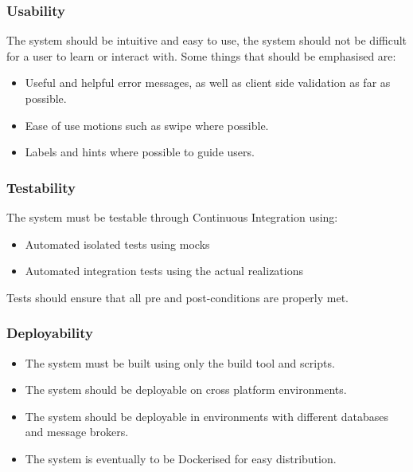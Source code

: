 \documentclass[11pt,a4paper]{article}
\begin{document}
\subsubsection{Usability}
The system should be intuitive and easy to use, the system should not be difficult for a user to learn or interact with. Some things that should be emphasised are:
\begin{itemize}
	\item Useful and helpful error messages, as well as client side validation as far as possible.
	\item Ease of use motions such as swipe where possible.
	\item Labels and hints where possible to guide users.
\end{itemize}

\subsubsection{Testability}
The system must be testable through Continuous Integration using:  
\begin{itemize}
	\item Automated isolated tests using mocks
	\item Automated integration tests using the actual realizations 
\end{itemize}
Tests should ensure that all pre and post-conditions are properly met.

\subsubsection{Deployability}
\begin{itemize}
	\item The system must be built using only the build tool and scripts.
	\item The system should be deployable on cross platform environments.
	\item The system should be deployable in environments with different databases and message brokers.
	\item The system is eventually to be Dockerised for easy distribution. 
\end{itemize}

\pagebreak
\end{document}
